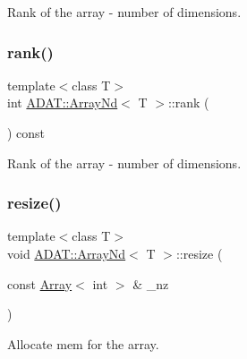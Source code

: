 Rank of the array -\/ number of dimensions. 

\mbox{\label{classADAT_1_1ArrayNd_a3f681a80aee7e76cc959431f45d931f8}} 
\subsubsection{\texorpdfstring{rank()}{rank()}\hspace{0.1cm}{\footnotesize\ttfamily [3/3]}}
{\footnotesize\ttfamily template$<$class T$>$ \\
int \mbox{\hyperlink{classADAT_1_1ArrayNd}{A\+D\+A\+T\+::\+Array\+Nd}}$<$ T $>$\+::rank (\begin{DoxyParamCaption}{ }\end{DoxyParamCaption}) const\hspace{0.3cm}{\ttfamily [inline]}}



Rank of the array -\/ number of dimensions. 

\mbox{\label{classADAT_1_1ArrayNd_afcf13cf80c4cb861316d1ad55601818e}} 
\subsubsection{\texorpdfstring{resize()}{resize()}\hspace{0.1cm}{\footnotesize\ttfamily [1/15]}}
{\footnotesize\ttfamily template$<$class T$>$ \\
void \mbox{\hyperlink{classADAT_1_1ArrayNd}{A\+D\+A\+T\+::\+Array\+Nd}}$<$ T $>$\+::resize (\begin{DoxyParamCaption}\item[{const \mbox{\hyperlink{classXMLArray_1_1Array}{Array}}$<$ int $>$ \&}]{\+\_\+nz }\end{DoxyParamCaption})\hspace{0.3cm}{\ttfamily [inline]}}



Allocate mem for the array. 

\mbox{\label{classADAT_1_1ArrayNd_afcf13cf80c4cb861316d1ad55601818e}} 
